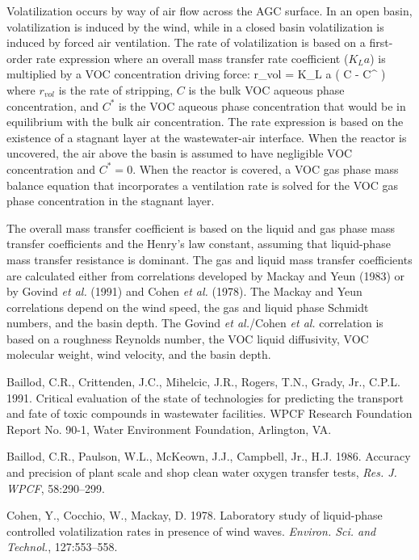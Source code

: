 Volatilization occurs by way of air flow across the AGC surface. In an open
basin, volatilization is induced by the wind, while in a closed basin
volatilization is induced by forced air ventilation.  The rate of
volatilization is based on a first-order rate expression where an overall mass
transfer rate coefficient ($K_L a$) is multiplied by a VOC concentration
driving force:
\mb
r_{vol} = K_L a ( C - C^{\ast} )
\mef
where $r_{vol}$ is the rate of stripping, $C$ is the bulk VOC aqueous phase
concentration, and $C^{\ast}$ is the VOC aqueous phase concentration that would
be in equilibrium with the bulk air concentration.  The rate expression is
based on the existence of a stagnant layer at the wastewater-air interface.
When the reactor is uncovered, the air above the basin is assumed to have
negligible VOC concentration and $C^{\ast} = 0$.  When the reactor is covered,
a VOC gas phase mass balance equation that incorporates a ventilation rate is
solved for the VOC gas phase concentration in the stagnant layer.  

The overall mass transfer coefficient is based on the liquid and gas phase mass
transfer coefficients and the Henry's law constant, assuming that liquid-phase
mass transfer resistance is dominant.  The gas and liquid mass transfer
coefficients are calculated either from correlations developed by Mackay and
Yeun (1983) or by Govind {\it et al.} (1991) and Cohen {\it et al.} (1978).
The Mackay and Yeun correlations depend on the wind speed, the gas and liquid
phase Schmidt numbers, and the basin depth.  The Govind {\it et al.}/Cohen {\it
et al.} correlation is based on a roughness Reynolds number, the VOC liquid
diffusivity, VOC molecular weight, wind velocity, and the basin depth.


Baillod, C.R., Crittenden, J.C., Mihelcic, J.R., Rogers, T.N., Grady, Jr.,
C.P.L. 1991. Critical evaluation of the state of technologies for predicting
the transport and fate of toxic compounds in wastewater facilities. WPCF
Research Foundation Report No. 90-1, Water Environment Foundation, Arlington,
VA.

Baillod, C.R., Paulson, W.L., McKeown, J.J., Campbell, Jr., H.J. 1986. Accuracy
and precision of plant scale and shop clean water oxygen transfer tests, {\it
Res. J. WPCF}, 58:290--299.

Cohen, Y., Cocchio, W., Mackay, D. 1978. Laboratory study of liquid-phase
controlled volatilization rates in presence of wind waves. {\it Environ. Sci.
and Technol.}, 127:553--558.

